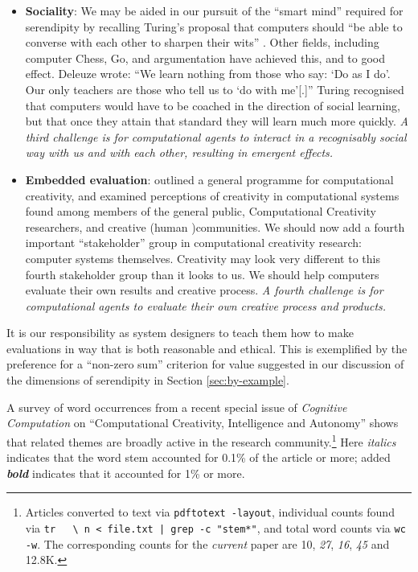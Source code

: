 \begin{itemize}
\item \textbf{Sociality}: We may be aided in our
  pursuit of the ``smart mind'' required for serendipity by recalling Turing's proposal that computers should ``be
  able to converse with each other to sharpen their wits''
  \cite{turing-intelligent}.  Other fields, including computer Chess,
  Go, and argumentation have achieved this, and to good effect.
  Deleuze \citeyear[p. 26]{deleuze1994difference} wrote: ``We learn
  nothing from those who say: `Do as I do'. Our only teachers are
  those who tell us to `do with me'[.]''  Turing recognised that
  computers would have to be coached in the direction of social
  learning, but that once they attain that standard they will learn
  much more quickly.  \emph{A third challenge is for computational
    agents to interact in a recognisably social way with us and with
    each other, resulting in emergent effects.}
\end{itemize}

\begin{itemize}
\item \textbf{Embedded evaluation}:
   outlined a general programme
  for computational creativity, and examined perceptions of creativity
  in computational systems found among members of the general public,
  Computational Creativity researchers, and creative (human )communities.  We should now add a fourth
  important ``stakeholder'' group in computational creativity
  research: computer systems themselves.  Creativity may look very
  different to this fourth stakeholder group than it looks to us.  We
  should help computers evaluate their own results and creative
  process.  \emph{A fourth challenge is for computational agents to
    evaluate their own creative process and products.}
\end{itemize}

It is our responsibility as system designers to teach them how to make
evaluations in way that is both reasonable and ethical.  This is
exemplified by the preference for a ``non-zero sum'' criterion for
value suggested in our discussion of the dimensions of serendipity in
Section \ref{sec:by-example}.

A survey of word occurrences from a recent special issue of
\emph{Cognitive Computation} on ``Computational Creativity, Intelligence and Autonomy'' \cite{bishop-erden-special-issue} shows that related themes are broadly
active in the research community.\footnote{Articles converted to text
  via {\tt pdftotext -layout}, individual counts found via {\tt tr
    \textquotesingle~\textquotesingle~\textquotesingle\textbackslash
    n\textquotesingle~< file.txt | grep -c "stem*"}, and total word counts
  via {\tt wc -w}.  The corresponding counts for the \emph{current}
  paper are 10, \emph{27}, \emph{16}, \emph{45} and 12.8K.}  Here
\emph{italics} indicates that the word stem accounted for 0.1\% of the
article or more; added \textbf{\emph{bold}} indicates that it
accounted for 1\% or more.

